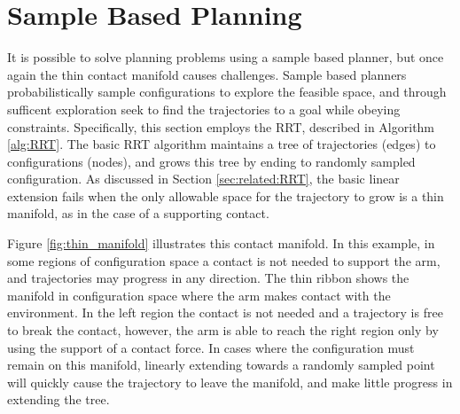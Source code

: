 \documentclass[../thesis.tex]{subfiles}
\begin{document}
\section{Sample Based Planning} \label{sec:sample_planning}
It is possible to solve planning problems using a sample based planner, but once again the thin contact manifold causes challenges.
Sample based planners probabilistically sample configurations to explore the feasible space, and through sufficent exploration seek to find the trajectories to a goal while obeying constraints.
Specifically, this section employs the RRT, described in Algorithm \ref{alg:RRT}.
The basic RRT algorithm maintains a tree of trajectories (edges) to configurations (nodes), and grows this tree by ending to randomly sampled configuration.
As discussed in Section \ref{sec:related:RRT}, the basic linear extension fails when the only allowable space for the trajectory to grow is a thin manifold, as in the case of a supporting contact.

Figure \ref{fig:thin_manifold} illustrates this contact manifold.
In this example, in some regions of configuration space a contact is not needed to support the arm, and trajectories may progress in any direction.
The thin ribbon shows the manifold in configuration space where the arm makes contact with the environment. In the left region the contact is not needed and a trajectory is free to break the contact, however, the arm is able to reach the right region only by using the support of a contact force.
In cases where the configuration must remain on this manifold, linearly extending towards a randomly sampled point will quickly cause the trajectory to leave the manifold, and make little progress in extending the tree.
\end{document}
